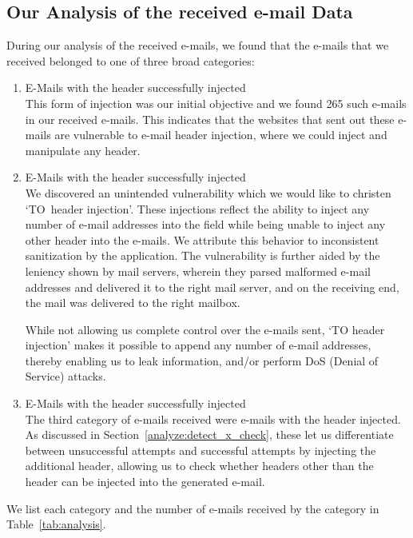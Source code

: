\subsection[Analysis of Data]{Our Analysis of the received e-mail Data}
During our analysis of the received e-mails, we found that the e-mails that we received belonged to one of three broad categories:
\begin{enumerate}
	\item E-Mails with the  header successfully injected\\
	This form of injection was our initial objective and we found 265 such e-mails in our received e-mails. This indicates that the websites that sent out these e-mails are vulnerable to e-mail header injection, where we could inject and manipulate any header.
	
	\item E-Mails with the  header successfully injected\\
	We discovered an unintended vulnerability which we would like to christen `TO~header injection'. These injections reflect the ability to inject any number of e-mail addresses into the  field while being unable to inject any other header into the e-mails. We attribute this behavior to inconsistent sanitization by the application. 
	The vulnerability is further aided by the leniency shown by mail servers, wherein they parsed malformed e-mail addresses and delivered it to the right mail server, and on the receiving end, the mail was delivered to the right mailbox. 
	
	While not allowing us complete control over the e-mails sent, `TO header injection' makes it possible to append any number of e-mail addresses, thereby enabling us to leak information, and/or perform DoS (Denial of Service) attacks.
	
	\item E-Mails with the  header successfully injected\\
    The third category of e-mails received were e-mails with the  header injected. As discussed in Section~\ref{analyze:detect_x_check}, 
    these let us differentiate between unsuccessful attempts and successful attempts by injecting the additional header, allowing us to check whether headers other than the  header can be injected into the generated e-mail. 
\end{enumerate}
We list each category and the number of e-mails received by the category in Table~\ref{tab:analysis}. 

